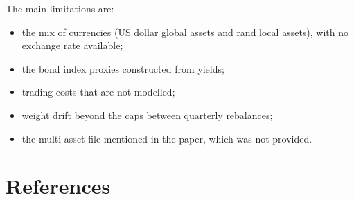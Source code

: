 \documentclass[11pt,preprint]{elsarticle}
\numberwithin{equation}{section}
\numberwithin{figure}{section}
\numberwithin{table}{section}
\def\tightlist{} %
\begin{document}
The main limitations are:

\begin{itemize}
\tightlist
\item
  the mix of currencies (US dollar global assets and rand local assets),
  with no exchange rate available;
\item
  the bond index proxies constructed from yields;
\item
  trading costs that are not modelled;
\item
  weight drift beyond the caps between quarterly rebalances;
\item
  the multi-asset file mentioned in the paper, which was not provided.
\end{itemize}

\newpage

\section*{References}\label{references}

\protect{}\label{refs}


\end{document}
